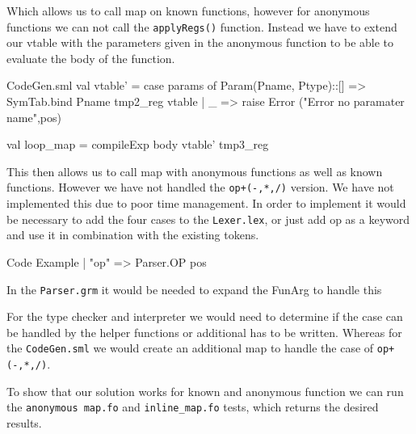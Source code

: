\documentclass[11pt,a4paper,oneside]{report}
\begin{document}
Which allows us to call map on known functions, however for anonymous functions we can not call the \texttt{applyRegs()} function. Instead we have to extend our vtable with the parameters given in the anonymous function to be able to evaluate the body of the function.
\begin{code}[firstnumber=612]{CodeGen.sml}
  val vtable' = case params of
                  Param(Pname, Ptype)::[]
                    => SymTab.bind Pname tmp2_reg vtable
                | _ => raise Error ("Error no paramater name",pos)

  val loop_map = compileExp body vtable' tmp3_reg
\end{code}

This then allows us to call map with anonymous functions as well as known functions. However we have not handled the \texttt{op+(-,*,/)} version. We have not implemented this due to poor time management.
In order to implement it would be necessary to add the four cases to the \texttt{Lexer.lex}, or just add op as a keyword and use it in combination with the existing tokens.
\begin{code}{Code Example}
       | "op"         => Parser.OP pos
\end{code}
In the \texttt{Parser.grm} it would be needed to expand the FunArg to handle this
For the type checker and interpreter we would need to determine if the case can be handled by the helper functions or additional has to be written. Whereas for the \texttt{CodeGen.sml} we would create an additional map to handle the case of \texttt{op+(-,*,/)}.


To show that our solution works for known and anonymous function we can run the \texttt{anonymous map.fo} and \texttt{inline\_map.fo} tests, which returns the desired results.
\end{document}

